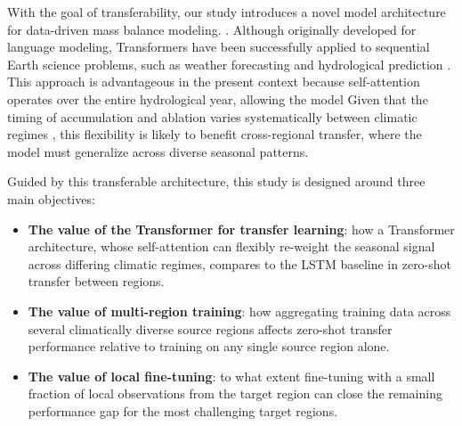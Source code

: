 \documentclass[draft]{agujournal2019}
\begin{document}
With the goal of transferability, our study introduces a novel model architecture for data-driven mass balance modeling.  \citep{Gers_2000}\citep{Vaswani2017}. Although originally developed for language modeling, Transformers have been successfully applied to sequential Earth science problems, such as weather forecasting and hydrological prediction \citep[e.g.,][]{Bilgin2021, Chattopadhyay2021, Liu2025}. This approach is advantageous in the present context because self-attention operates over the entire hydrological year, allowing the model  Given that the timing of accumulation and ablation varies systematically between climatic regimes \citep{Oerlemans_2001}, this flexibility is likely to benefit cross-regional transfer, where the model must generalize across diverse seasonal patterns.


Guided by this transferable architecture, this study is designed around three main objectives:
\begin{itemize}
    \item \textbf{The value of the Transformer for transfer learning}: how a Transformer architecture, whose self-attention can flexibly re-weight the seasonal signal across differing climatic regimes, compares to the LSTM baseline in zero-shot transfer between regions.
    \item \textbf{The value of multi-region training}: how aggregating training data across several climatically diverse source regions affects zero-shot transfer performance relative to training on any single source region alone.
    \item \textbf{The value of local fine-tuning}: to what extent fine-tuning with a small fraction of local observations from the target region can close the remaining performance gap for the most challenging target regions.
\end{itemize}
\end{document}
